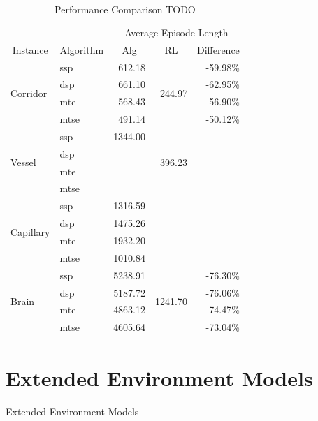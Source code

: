 \begin{table}
    \begin{center}
        \begin{tabular}{llrrr}
            \toprule
            & & \multicolumn{3}{c}{Average Episode Length} \\
            \cmidrule(lr){3-5} 
            \multicolumn{1}{c}{Instance} & \multicolumn{1}{c}{Algorithm} & \multicolumn{1}{c}{Alg} & \multicolumn{1}{c}{RL} & \multicolumn{1}{c}{Difference} \\
            \midrule
            \multirow{4}{*}{Corridor} & ssp & 612.18 & \multirow{4}{*}{244.97} & -59.98\% \\
            & dsp & 661.10 & & -62.95\% \\
            & mte & 568.43 & & -56.90\% \\
            & mtse & 491.14 & & -50.12\% \\
            \midrule
            \multirow{4}{*}{Vessel} & ssp & 1344.00 & \multirow{4}{*}{396.23} & \\
            & dsp & & & \\
            & mte & & & \\
            & mtse & & & \\
            \midrule
            \multirow{4}{*}{Capillary} & ssp & 1316.59 & & \\
            & dsp & 1475.26 & & \\
            & mte & 1932.20 & & \\
            & mtse & 1010.84 & & \\
            \midrule
            \multirow{4}{*}{Brain} & ssp & 5238.91 & \multirow{4}{*}{1241.70} & -76.30\% \\
            & dsp & 5187.72 & & -76.06\% \\
            & mte & 4863.12 & & -74.47\% \\
            & mtse & 4605.64 & & -73.04\% \\
            \bottomrule
        \end{tabular}

    \end{center}
    \caption{Performance Comparison TODO} \label{tab:Eval/PreviousAlgorithmicApproach}
\end{table}

\section{Extended Environment Models} \label{sec:EvalExtendedModels}
Extended Environment Models
